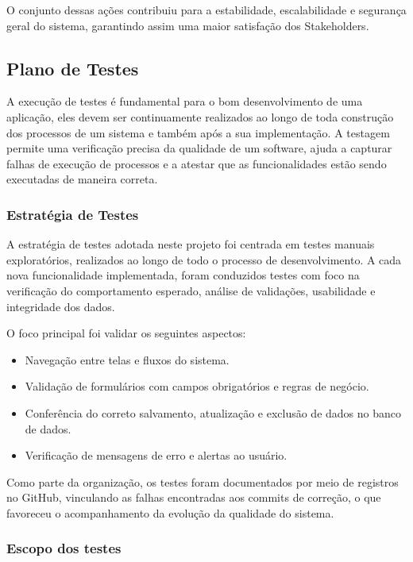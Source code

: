 \documentclass[
	12pt,				%
	openany,			%
	twoside,			%
	a4paper,			%
	english,			%
	brazil				%
	]{abntex2}
\begin{document}
O conjunto dessas ações contribuiu para a estabilidade, escalabilidade e segurança geral do sistema, garantindo assim uma maior satisfação dos Stakeholders.

\subsection{Plano de Testes}

A execução de testes é fundamental para o bom desenvolvimento de uma aplicação, eles devem ser continuamente realizados ao longo de toda construção dos processos de um sistema e também após a sua implementação. A testagem permite uma verificação precisa da qualidade de um software, ajuda a capturar falhas de execução de processos e a atestar que as funcionalidades estão sendo executadas de maneira correta.

\subsubsection{Estratégia de Testes}

A estratégia de testes adotada neste projeto foi centrada em testes manuais exploratórios, realizados ao longo de todo o processo de desenvolvimento. A cada nova funcionalidade implementada, foram conduzidos testes com foco na verificação do comportamento esperado, análise de validações, usabilidade e integridade dos dados.

O foco principal foi validar os seguintes aspectos:
\begin{itemize}
    \item Navegação entre telas e fluxos do sistema.
    \item Validação de formulários com campos obrigatórios e regras de negócio.
    \item Conferência do correto salvamento, atualização e exclusão de dados no banco de dados.
    \item Verificação de mensagens de erro e alertas ao usuário.
\end{itemize}

Como parte da organização, os testes foram documentados por meio de registros no GitHub, vinculando as falhas encontradas aos commits de correção, o que favoreceu o acompanhamento da evolução da qualidade do sistema.

\subsubsection{Escopo dos testes}
\end{document}
